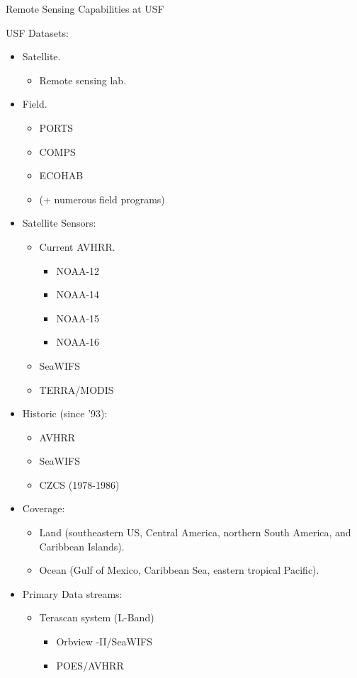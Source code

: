 Remote Sensing Capabilities at USF

USF Datasets:
\begin{itemize}
\item Satellite.
  \begin{itemize}
  \item Remote sensing lab.
  \end{itemize}

\item Field.
  \begin{itemize}
  \item PORTS
  \item COMPS
  \item ECOHAB
  \item (+ numerous field programs)
  \end{itemize}

\item Satellite Sensors:
  \begin{itemize}
  \item Current AVHRR.
    \begin{itemize}
    \item NOAA-12
    \item NOAA-14
    \item NOAA-15
    \item NOAA-16
    \end{itemize}
  \item SeaWIFS
  \item TERRA/MODIS
  \end{itemize}

\item Historic (since '93):
  \begin{itemize}
  \item AVHRR
  \item SeaWIFS
  \item CZCS (1978-1986)
  \end{itemize}

\item Coverage:
  \begin{itemize}
  \item Land (southeastern US, Central America, northern South America, and Caribbean Islands).
  \item Ocean (Gulf of Mexico, Caribbean Sea, eastern tropical Pacific).
  \end{itemize}

\item Primary Data streams:
  \begin{itemize}
  \item Terascan system (L-Band)
    \begin{itemize}
    \item Orbview -II/SeaWIFS
    \item POES/AVHRR
    \end{itemize}


\end{itemize}
\end{itemize}

